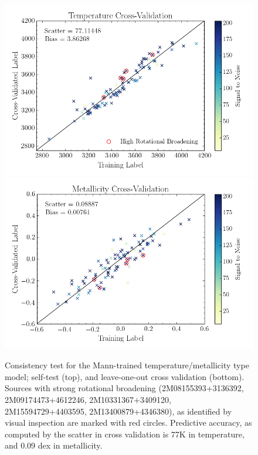\documentclass[twocolumn]{aastex62}
\begin{document}
\begin{figure}
	\includegraphics[width=\linewidth]{figures/crv_test_teff.png}
	\includegraphics[width=\linewidth]{figures/crv_test_fe_h.png}
	\caption{Consistency test for the Mann-trained temperature/metallicity type model; self-test (top), and leave-one-out cross validation (bottom). Sources with strong rotational broadening (2M08155393+3136392, 2M09174473+4612246, 2M10331367+3409120, 2M15594729+4403595, 2M13400879+4346380), as identified by visual inspection are marked with red circles. Predictive accuracy, as computed by the scatter in cross validation is 77K in temperature, and 0.09 dex in metallicity.} 
	\label{fig:mann_validation}
\end{figure}
\end{document}
